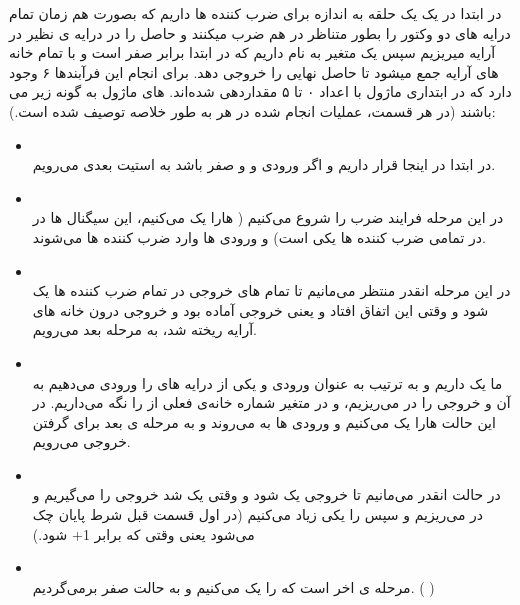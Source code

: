 \documentclass[12pt,titlepage,a4page , tikz , multi,table , svgnames,xcdraw]{article}
\begin{document}
در ابتدا در یک
یک حلقه به اندازه 
برای ضرب کننده ها
داریم که بصورت هم زمان تمام درایه های دو وکتور را بطور متناظر در هم ضرب میکنند و حاصل را در درایه ی نظیر در آرایه 
میریزیم سپس یک متغیر به نام
داریم که در ابتدا برابر صفر است و با تمام خانه های آرایه
جمع میشود تا حاصل نهایی را خروجی دهد.
برای انجام این فرآبند‌ها ۶ 
وجود دارد که در ابتداری ماژول با اعداد ۰ تا ۵ مقداردهی شده‌اند.
 های ماژول به گونه زیر می باشند (در هر قسمت، عملیات انجام شده در هر 
 به طور خلاصه توصیف شده است.): 
 
 
\begin{itemize}

\item {} \\
در ابتدا در اینجا قرار داریم و اگر ورودی 
و 
و 
صفر باشد به استیت بعدی می‌رویم.

\item {} \\
در این مرحله فرایند ضرب را شروع می‌کنیم
( 
هارا یک می‌کنیم، این سیگنال ها در در تمامی ضرب کننده ها یکی است) و ورودی ها وارد ضرب کننده ها می‌شوند.

\item {} \\
در این مرحله انقدر منتظر می‌مانیم تا تمام 
های خروجی در تمام ضرب کننده ها یک شود و وقتی این اتفاق افتاد و یعنی خروجی آماده بود و خروجی درون خانه های آرایه 
ریخته شد، به مرحله بعد می‌رویم.

\item {} \\
ما یک 
داریم و به ترتیب به عنوان ورودی 
و یکی از درایه های 
را ورودی می‌دهیم به آن و خروجی را در 
می‌ریزیم، و در متغیر 
شماره خانه‌ی فعلی از 
را نگه می‌داریم. در این حالت
هارا یک می‌کنیم و ورودی ها به 
می‌روند و به مرحله ی بعد برای گرفتن خروجی می‌رویم.

\item {} \\
در حالت انقدر می‌مانیم تا 
خروجی یک شود و وقتی یک شد خروجی را می‌گیریم و در 
می‌ریزیم و سپس
را یکی زیاد می‌کنیم (در اول قسمت قبل شرط پایان چک می‌شود یعنی وقتی که 
برابر 1+
شود.)

\item {} \\
مرحله ی اخر است که 
را یک می‌کنیم و به حالت صفر برمی‌گردیم.
(
)

\end{itemize}
\end{document}
